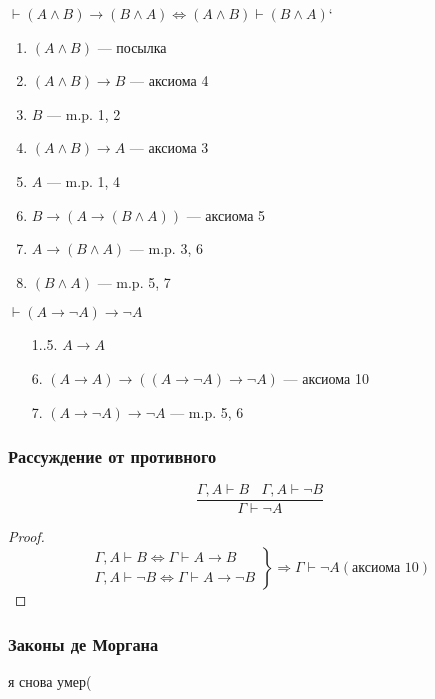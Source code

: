 \begin{example}
    $\vdash (A \wedge B) \rightarrow (B \wedge A) \Leftrightarrow (A \wedge B) \vdash (B \wedge A)$`
    \begin{enumerate}
        \item $(A \wedge B)$ --- посылка
        \item $(A \wedge B) \rightarrow B$ --- аксиома 4
        \item $B$ --- m.p. 1, 2
        \item $(A \wedge B) \rightarrow A$ --- аксиома 3
        \item $A$ --- m.p. 1, 4
        \item $B \rightarrow (A \rightarrow (B \wedge A))$ --- аксиома 5
        \item $A \rightarrow (B \wedge A)$ --- m.p. 3, 6
        \item $(B \wedge A)$ --- m.p. 5, 7
    \end{enumerate}
\end{example}

\begin{example}
    $\vdash (A \rightarrow \neg A) \rightarrow \neg A$
    \begin{enumerate}
        \item[1..5.] $A \rightarrow A$
        \item[6.] $(A \rightarrow A) \rightarrow ((A \rightarrow \neg A) \rightarrow \neg A)$ --- аксиома 10
        \item[7.] $(A \rightarrow \neg A) \rightarrow \neg A$ --- m.p. 5, 6
    \end{enumerate}
\end{example}

\subsubsection{Рассуждение от противного}
$$\frac{\Gamma, A \vdash B\ \ \ \ \Gamma, A \vdash \neg B}{\Gamma \vdash \neg A}$$
\begin{proof}
    $$\left.\begin{array}{l}
        \Gamma, A \vdash B \Leftrightarrow \Gamma \vdash A \rightarrow B  \\
        \Gamma, A \vdash \neg B \Leftrightarrow \Gamma \vdash A \rightarrow \neg B
    \end{array}\right\}\Rightarrow\Gamma \vdash \neg A (\text{аксиома 10})$$
\end{proof}

\subsubsection{Законы де Моргана}
я снова умер(

